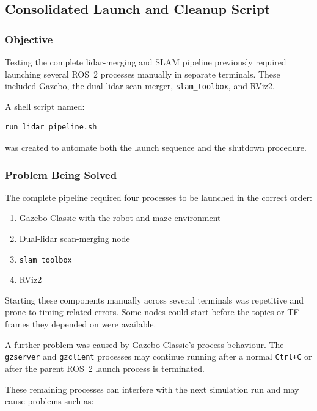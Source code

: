\documentclass{article}
\begin{document}
\subsection{Consolidated Launch and Cleanup Script}
\label{sec:run_lidar_pipeline}

\subsubsection{Objective}

Testing the complete lidar-merging and SLAM pipeline previously required launching several ROS~2 processes manually in separate terminals. These included Gazebo, the dual-lidar scan merger, \texttt{slam\_toolbox}, and RViz2.

A shell script named:

\begin{verbatim}
run_lidar_pipeline.sh
\end{verbatim}

was created to automate both the launch sequence and the shutdown procedure.

\subsubsection{Problem Being Solved}

The complete pipeline required four processes to be launched in the correct order:

\begin{enumerate}
    \item Gazebo Classic with the robot and maze environment
    \item Dual-lidar scan-merging node
    \item \texttt{slam\_toolbox}
    \item RViz2
\end{enumerate}

Starting these components manually across several terminals was repetitive and prone to timing-related errors. Some nodes could start before the topics or TF frames they depended on were available.

A further problem was caused by Gazebo Classic's process behaviour. The \texttt{gzserver} and \texttt{gzclient} processes may continue running after a normal \texttt{Ctrl+C} or after the parent ROS~2 launch process is terminated.

These remaining processes can interfere with the next simulation run and may cause problems such as:
\end{document}
